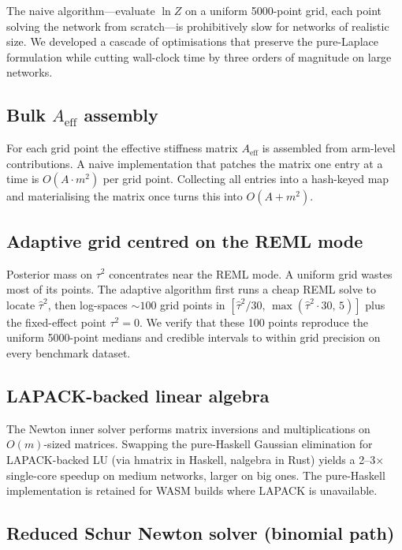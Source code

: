 \documentclass[12pt]{article}
\begin{document}
The naive algorithm---evaluate $\ln Z$ on a uniform 5000-point grid,
each point solving the network from scratch---is prohibitively slow
for networks of realistic size. We developed a cascade of
optimisations that preserve the pure-Laplace formulation while
cutting wall-clock time by three orders of magnitude on large
networks.

\subsection{Bulk $A_{\text{eff}}$ assembly}

For each grid point the effective stiffness matrix $A_{\text{eff}}$
is assembled from arm-level contributions. A naive implementation
that patches the matrix one entry at a time is
$O(A \cdot m^2)$ per grid point. Collecting all entries into a
hash-keyed map and materialising the matrix once turns this into
$O(A + m^2)$.

\subsection{Adaptive grid centred on the REML mode}

Posterior mass on $\tau^2$ concentrates near the REML mode. A
uniform grid wastes most of its points. The adaptive algorithm
first runs a cheap REML solve to locate $\hat{\tau}^2$, then
log-spaces $\sim 100$ grid points in
$[\hat{\tau}^2 / 30,\, \max(\hat{\tau}^2 \cdot 30,\, 5)]$ plus the
fixed-effect point $\tau^2 = 0$. We verify that these 100 points
reproduce the uniform 5000-point medians and credible intervals to
within grid precision on every benchmark dataset.

\subsection{LAPACK-backed linear algebra}

The Newton inner solver performs matrix inversions and multiplications
on $O(m)$-sized matrices. Swapping the pure-Haskell Gaussian
elimination for LAPACK-backed LU (via hmatrix in Haskell, nalgebra in
Rust) yields a 2--3$\times$ single-core speedup on medium networks,
larger on big ones. The pure-Haskell implementation is retained for
WASM builds where LAPACK is unavailable.

\subsection{Reduced Schur Newton solver (binomial path)}
\end{document}
